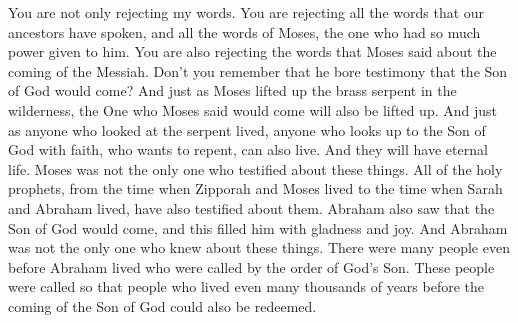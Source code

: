 \bverse \iffalse But, behold, ye not only deny my words, but ye also deny all the words which have been spoken by our fathers, and also the words which were spoken by this man, Moses, who had such great power given unto him, yea, the words which he hath spoken concerning the coming of the Messiah. \fi
You are not only rejecting my words. You are rejecting all the words that our ancestors have spoken, and all the words of Moses, the one who had so much power given to him. You are also rejecting the words that Moses said about the coming of the Messiah.
\bverse \iffalse Yea, did he not bear record that the Son of God should come?  And as he lifted up the brazen serpent in the wilderness, even so shall he be lifted up who should come. \fi
Don't you remember that he bore testimony that the Son of God would come? And just as Moses lifted up the brass serpent in the wilderness, the One who Moses said would come will also be lifted up.
\bverse \iffalse And as many as should look upon that serpent should live, even so as many as should look upon the Son of God with faith, having a contrite spirit, might live, even unto that life which is eternal. \fi
And just as anyone who looked at the serpent lived, anyone who looks up to the Son of God with faith, who wants to repent, can also live. And they will have eternal life.
\bverse \iffalse And now behold, Moses did not only testify of these things, but also all the holy prophets, from his days even to the days of Abraham. \fi
Moses was not the only one who testified about these things. All of the holy prophets, from the time when Zipporah and Moses lived to the time when Sarah and Abraham lived, have also testified about them.
\bverse \iffalse Yea, and behold, Abraham saw of his coming, and was filled with gladness and did rejoice. \fi
Abraham also saw that the Son of God would come, and this filled him with gladness and joy.
\bverse \iffalse Yea, and behold I say unto you, that Abraham not only knew of these things, but there were many before the days of Abraham who were called by the order of God; yea, even after the order of his Son; and this that it should be shown unto the people, a great many thousand years before his coming, that even redemption should come unto them. \fi
And Abraham was not the only one who knew about these things. There were many people even before Abraham lived who were called by the order of God's Son. These people were called so that people who lived even many thousands of years before the coming of the Son of God could also be redeemed.

